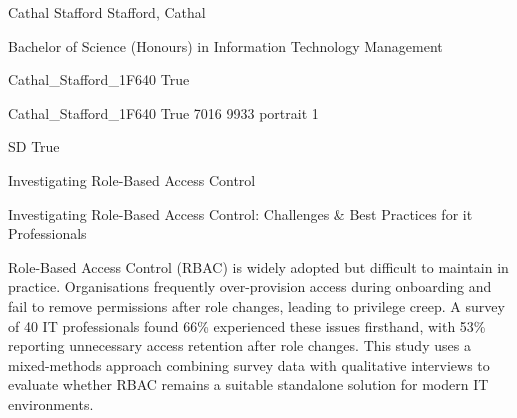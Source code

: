 
\begingroup{}\relax



\def\Key{Cathal_Stafford_1F640}

{Cathal Stafford}
{Stafford, Cathal}

{Bachelor of Science (Honours) in Information Technology Management}

{Cathal_Stafford_1F640}
{True}

{Cathal_Stafford_1F640}
{True}
{7016}
{9933}
{portrait}
{1}

{SD}
{True}

{Investigating Role-Based Access Control}

{Investigating Role-Based Access Control: Challenges \& Best Practices for it Professionals}

{Role-Based Access Control (RBAC) is widely adopted but difficult to maintain in practice. Organisations frequently over-provision access during onboarding and fail to remove permissions after role changes, leading to privilege creep. A survey of 40 IT professionals found 66\% experienced these issues firsthand, with 53\% reporting unnecessary access retention after role changes. This study uses a mixed-methods approach combining survey data with qualitative interviews to evaluate whether RBAC remains a suitable standalone solution for modern IT environments.}

